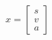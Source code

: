 \documentclass[preview]{standalone}
\begin{document}
\begin{align*}
x = \begin{bmatrix} s \\ v \\ a \end{bmatrix}
\end{align*}
\end{document}
